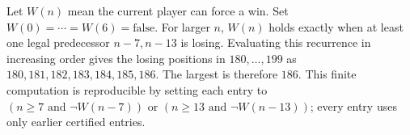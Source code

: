 Let $W(n)$ mean the current player can force a win. Set $W(0)=\cdots=W(6)=\mathrm{false}$. For larger $n$, $W(n)$ holds exactly when at least one legal predecessor $n-7,n-13$ is losing. Evaluating this recurrence in increasing order gives the losing positions in $180,\ldots,199$ as $180,181,182,183,184,185,186$. The largest is therefore $\boxed{186}$. This finite computation is reproducible by setting each entry to $(n\ge7\text{ and }\neg W(n-7))\text{ or }(n\ge13\text{ and }\neg W(n-13))$; every entry uses only earlier certified entries.
